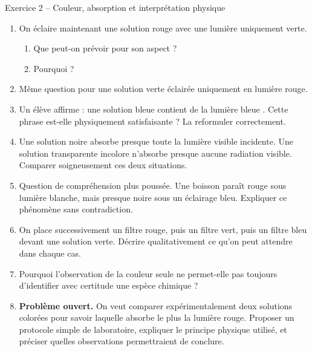 \documentclass[11pt,a4paper]{article}
\begin{document}
\begin{exobox}{Exercice 2 -- Couleur, absorption et interprétation physique}
\begin{enumerate}[label=\textbf{\arabic*.}]
    \item On éclaire maintenant une solution rouge avec une lumière uniquement verte.
    \begin{enumerate}[label=\alph*)]
        \item Que peut-on prévoir pour son aspect ?
        \item Pourquoi ?
    \end{enumerate}

    \item Même question pour une solution verte éclairée uniquement en lumière rouge.

    \item Un élève affirme : \og une solution bleue contient de la lumière bleue \fg.  
    Cette phrase est-elle physiquement satisfaisante ? La reformuler correctement.

    \item Une solution noire absorbe presque toute la lumière visible incidente.  
    Une solution transparente incolore n’absorbe presque aucune radiation visible.  
    Comparer soigneusement ces deux situations.

    \item Question de compréhension plus poussée.  
    Une boisson paraît rouge sous lumière blanche, mais presque noire sous un éclairage bleu.  
    Expliquer ce phénomène sans contradiction.

    \item On place successivement un filtre rouge, puis un filtre vert, puis un filtre bleu devant une solution verte. Décrire qualitativement ce qu’on peut attendre dans chaque cas.

    \item Pourquoi l’observation de la couleur seule ne permet-elle pas toujours d’identifier avec certitude une espèce chimique ?

    \item \textbf{Problème ouvert.}  
    On veut comparer expérimentalement deux solutions colorées pour savoir laquelle absorbe le plus la lumière rouge.  
    Proposer un protocole simple de laboratoire, expliquer le principe physique utilisé, et préciser quelles observations permettraient de conclure.
\end{enumerate}
\end{exobox}
\end{document}
